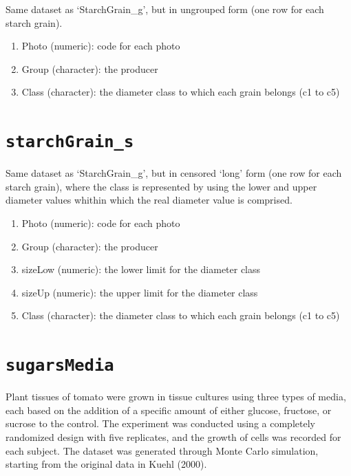 \documentclass[
  letterpaper,
  DIV=11,
  numbers=noendperiod]{scrreprt}
\providecommand{\tightlist}{%
  \setlength{\itemsep}{0pt}\setlength{\parskip}{0pt}}
\begin{document}

Same dataset as `StarchGrain\_g', but in ungrouped form (one row for
each starch grain).

\begin{enumerate}
\def\labelenumi{\arabic{enumi}.}
\tightlist
\item
  Photo (numeric): code for each photo
\item
  Group (character): the producer
\item
  Class (character): the diameter class to which each grain belongs (c1
  to c5)
\end{enumerate}

\section*{\texorpdfstring{\texttt{starchGrain\_s}}{starchGrain\_s}}\label{StarchGrain_s}


Same dataset as `StarchGrain\_g', but in censored `long' form (one row
for each starch grain), where the class is represented by using the
lower and upper diameter values whithin which the real diameter value is
comprised.

\begin{enumerate}
\def\labelenumi{\arabic{enumi}.}
\tightlist
\item
  Photo (numeric): code for each photo
\item
  Group (character): the producer
\item
  sizeLow (numeric): the lower limit for the diameter class
\item
  sizeUp (numeric): the upper limit for the diameter class
\item
  Class (character): the diameter class to which each grain belongs (c1
  to c5)
\end{enumerate}

\section*{\texorpdfstring{\texttt{sugarsMedia}}{sugarsMedia}}\label{sugarsmedia}


Plant tissues of tomato were grown in tissue cultures using three types
of media, each based on the addition of a specific amount of either
glucose, fructose, or sucrose to the control. The experiment was
conducted using a completely randomized design with five replicates, and
the growth of cells was recorded for each subject. The dataset was
generated through Monte Carlo simulation, starting from the original
data in Kuehl (2000).
\end{document}
